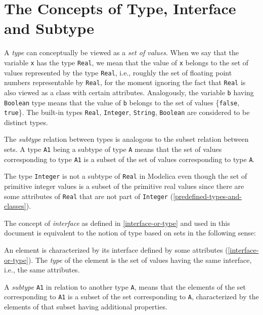 \section{The Concepts of Type, Interface and Subtype}\label{the-concepts-of-type-interface-and-subtype}

A \emph{type} can conceptually be viewed as a \emph{set of values}.
When we say that the variable \lstinline!x! has the type \lstinline!Real!, we mean that the value of \lstinline!x! belongs to the set of values represented by the type \lstinline!Real!, i.e., roughly the set of floating point numbers representable by \lstinline!Real!, for the moment ignoring the fact that \lstinline!Real! is also viewed as a class with certain attributes.
Analogously, the variable \lstinline!b! having \lstinline!Boolean! type means that the value of \lstinline!b! belongs to the set of values \{\lstinline!false!, \lstinline!true!\}.
The built-in types \lstinline!Real!, \lstinline!Integer!, \lstinline!String!, \lstinline!Boolean! are considered to be distinct types.

The \emph{subtype} relation between types is analogous to the subset relation between sets.
A type \lstinline!A1! being a subtype of type \lstinline!A! means that the set of values corresponding to type \lstinline!A1! is a subset of the set of values corresponding to type \lstinline!A!.

The type \lstinline!Integer! is not a subtype of \lstinline!Real! in Modelica even though the set of primitive integer values is a subset of the primitive real values since there are some attributes of \lstinline!Real! that are not part of \lstinline!Integer! (\cref{predefined-types-and-classes}).

The concept of \emph{interface} as defined in \cref{interface-or-type} and used in this document is equivalent to the notion of type based on sets in the following sense:

An element is characterized by its interface defined by some attributes (\cref{interface-or-type}).
The \emph{type} of the element is the set of values having the same interface, i.e., the same attributes.

A \emph{subtype} \lstinline!A1! in relation to another type \lstinline!A!, means that the elements of the set corresponding to \lstinline!A1! is a subset of the set corresponding to \lstinline!A!, characterized by the elements of that subset having additional properties.


